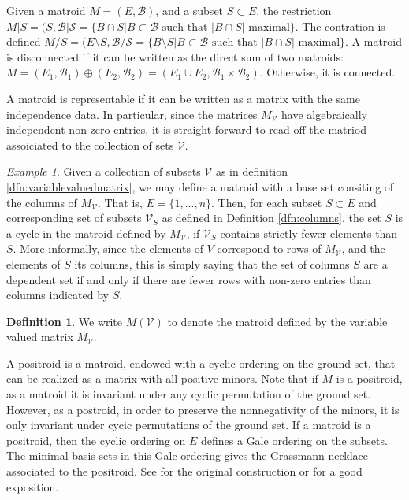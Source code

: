 \documentclass[11pt]{article}
\newcommand{\cV}{\mathcal{V}}
\theoremstyle{remark}
\newtheorem{eg}[thm]{Example}
\theoremstyle{definition}
\newtheorem{dfn}[thm]{Definition}
\begin{document}
Given a matroid $M = (E, \mathcal{B})$, and a subset $S \subset E$, the restriction $M|S = (S, \mathcal{B|S} = \{B\cap S| B \subset \mathcal{B} \textrm{ such that } |B \cap S| \textrm{ maximal} \}$. The contration is defined $M/S = (E \setminus S, \mathcal{B/S} = \{B\setminus S| B \subset \mathcal{B} \textrm{ such that } |B \cap S| \textrm{ maximal}\}$. A matroid is disconnected if it can be written as the direct sum of two matroids: $M = (E_1, \mathcal{B}_1) \oplus (E_2, \mathcal{B}_2)  = (E_1 \cup E_2 , \mathcal{B}_1 \times \mathcal{B}_2)$. Otherwise, it is connected.

A matroid is representable if it can be written as a matrix with the same independence data. In particular, since the matrices $M_\cV$ have algebraically independent non-zero entries, it is straight forward to read off the matriod assoiciated to the collection of sets $\cV$.

\begin{eg}\label{eg:variablevaluesasmatroids}
  Given a collection of subsets $\cV$ as in definition \ref{dfn:variablevaluedmatrix}, we may define a matroid with a base set consiting of the columns of $M_\cV$. That is, $E = \{1, \ldots , n\}$. Then, for each subset $S \subset E$ and corresponding set of subsets $\cV_S$ as defined in Definition \ref{dfn:columns}, the set $S$ is a cycle in the matroid defined by $M_\cV$, if $\cV_S$ contains strictly fewer elements than $S$. More informally, since the elements of $V$ correspond to rows of $M_\cV$, and the elements of $S$ its columns, this is simply saying that the set of columns $S$ are a dependent set if and only if there are fewer rows with non-zero entries than columns indicated by $S$. 
\end{eg}

\begin{dfn}\label{dfn:matroid}
We write $M(\cV)$ to denote the matroid defined by the variable valued matrix $M_\cV$. 
\end{dfn}



A positroid is a matroid, endowed with a cyclic ordering on the ground set, that can be realized as a matrix with all positive minors. Note that if $M$ is a positroid, as a matroid it is invariant under any cyclic permutation of the ground set. However, as a postroid, in order to  preserve the nonnegativity of the minors, it is only invariant under cycic permutations of the ground set. If a matroid is a positroid, then the cyclic ordering on $E$ defines a Gale ordering on the subsets. The minimal basis sets in this Gale ordering gives the Grassmann necklace associated to the positroid. See \cite[Chp ??]{Postnikov} for the original construction or \cite{non-crossingpartiion} for a good exposition.
\end{document}
